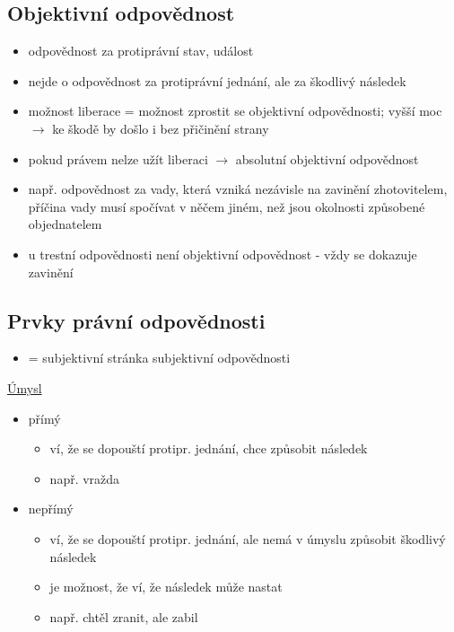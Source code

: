 \subsection*{Objektivní odpovědnost}
\begin{itemize}
    \item odpovědnost za protiprávní stav, událost
    \item nejde o odpovědnost za protiprávní jednání, ale za škodlivý následek
    \item možnost liberace = možnost zprostit se objektivní odpovědnosti; vyšší moc $\longrightarrow$ ke škodě by došlo i bez přičinění strany 
    \item pokud právem nelze  užít liberaci $\longrightarrow$ absolutní objektivní odpovědnost
    \item např. odpovědnost za vady, která vzniká nezávisle na zavinění zhotovitelem, příčina vady musí spočívat v něčem jiném, než jsou okolnosti způsobené objednatelem
    \item  u trestní odpovědnosti není objektivní odpovědnost - vždy se dokazuje zavinění 
\end{itemize} 

\subsection*{Prvky právní odpovědnosti}
\begin{itemize}
    \item = subjektivní stránka subjektivní odpovědnosti \\
\end{itemize}

\underline{Úmysl}
\begin{itemize}
    \item přímý
    \begin{itemize}
        \item ví, že se dopouští protipr. jednání, chce způsobit následek
        \item např. vražda
    \end{itemize}
    \item nepřímý
    \begin{itemize}
        \item ví, že se dopouští protipr. jednání, ale nemá v úmyslu způsobit škodlivý následek
        \item je možnost, že ví, že následek může nastat
        \item např. chtěl zranit, ale zabil \\
    \end{itemize}
\end{itemize}

